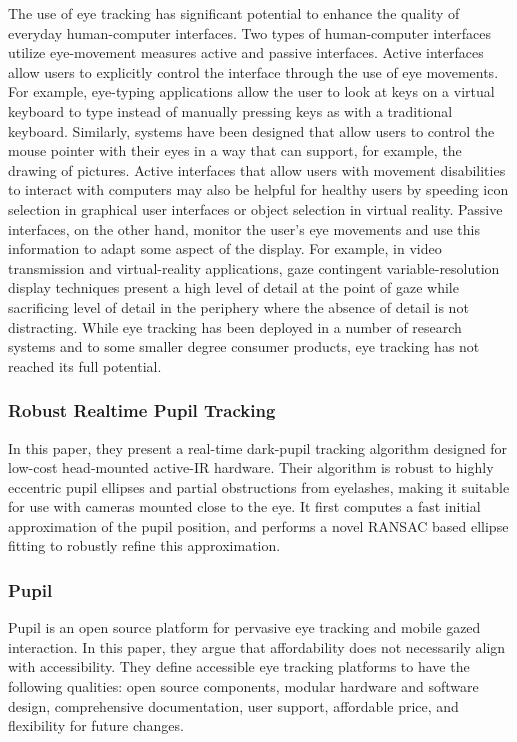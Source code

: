 The use of eye tracking has significant potential to enhance the quality of everyday human-computer interfaces. Two types of human-computer interfaces utilize eye-movement measures active and passive interfaces. Active interfaces allow users to explicitly control the interface through the use of eye movements. For example, eye-typing applications allow the user to look at keys on a virtual keyboard to type instead of manually pressing keys as with a traditional keyboard. Similarly, systems have been designed that allow users to control the mouse pointer with their eyes in a way that can support, for example, the drawing of pictures. Active interfaces that allow users with movement disabilities to interact with computers may also be helpful for healthy users by speeding icon selection in graphical user interfaces or object selection in virtual reality. Passive interfaces, on the other hand, monitor the user's eye movements and use this information to adapt some aspect of the display. For example, in video transmission and virtual-reality applications, gaze contingent variable-resolution display techniques present a high level of detail at the point of gaze while sacrificing level of detail in the periphery where the absence of detail is not distracting. While eye tracking has been deployed in a number of research systems and to some smaller degree consumer products, eye tracking has not reached its full potential.

\subsubsection{Robust Realtime Pupil Tracking}
In this paper, they present a real-time dark-pupil tracking algorithm designed for low-cost head-mounted active-IR hardware. Their algorithm is robust to highly eccentric pupil ellipses and partial obstructions from eyelashes, making it suitable for use with cameras mounted close to the eye. It first computes a fast initial approximation of the pupil position, and performs a novel RANSAC based ellipse fitting to robustly refine this approximation.

\subsubsection{Pupil}
Pupil is an open source platform for pervasive eye tracking and mobile gazed interaction. In this paper, they argue that affordability does not necessarily align with accessibility. They define accessible eye tracking platforms to have the following qualities: open source components, modular hardware and software design, comprehensive documentation, user support, affordable price, and flexibility for future changes. \bigskip

